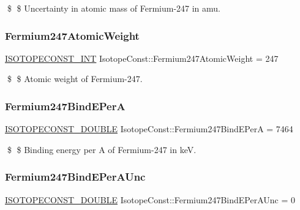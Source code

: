 \$ \$ Uncertainty in atomic mass of Fermium-\/247 in amu. \mbox{\label{group___isotope_const-_fermium-_fm247_ga93c8cf98efade7a2cd1a647b7f9267f0}} 
\subsubsection{\texorpdfstring{Fermium247\+Atomic\+Weight}{Fermium247AtomicWeight}}
{\footnotesize\ttfamily \mbox{\hyperlink{group___isotope_const-_macros_ga5f18360b3e99483a35c32d789e62621c}{I\+S\+O\+T\+O\+P\+E\+C\+O\+N\+S\+T\+\_\+\+I\+NT}} Isotope\+Const\+::\+Fermium247\+Atomic\+Weight = 247}

\$ \$ Atomic weight of Fermium-\/247. \mbox{\label{group___isotope_const-_fermium-_fm247_ga7588dc6eed44db5de4b06f623f5c78a0}} 
\subsubsection{\texorpdfstring{Fermium247\+Bind\+E\+PerA}{Fermium247BindEPerA}}
{\footnotesize\ttfamily \mbox{\hyperlink{group___isotope_const-_macros_ga8f45a7272ce02c0b4c65c44636ed719a}{I\+S\+O\+T\+O\+P\+E\+C\+O\+N\+S\+T\+\_\+\+D\+O\+U\+B\+LE}} Isotope\+Const\+::\+Fermium247\+Bind\+E\+PerA = 7464}

\$ \$ Binding energy per A of Fermium-\/247 in keV. \mbox{\label{group___isotope_const-_fermium-_fm247_ga05be2d4a33170b033b54c76a14e75fb9}} 
\subsubsection{\texorpdfstring{Fermium247\+Bind\+E\+Per\+A\+Unc}{Fermium247BindEPerAUnc}}
{\footnotesize\ttfamily \mbox{\hyperlink{group___isotope_const-_macros_ga8f45a7272ce02c0b4c65c44636ed719a}{I\+S\+O\+T\+O\+P\+E\+C\+O\+N\+S\+T\+\_\+\+D\+O\+U\+B\+LE}} Isotope\+Const\+::\+Fermium247\+Bind\+E\+Per\+A\+Unc = 0}

